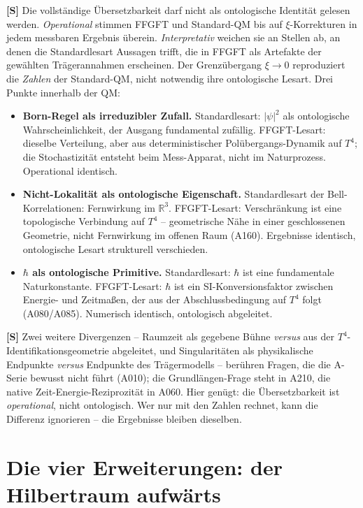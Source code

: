 \textbf{[S]} Die vollständige Übersetzbarkeit darf nicht als ontologische
Identität gelesen werden. \emph{Operational} stimmen FFGFT und Standard-QM bis
auf $\xi$-Korrekturen in jedem messbaren Ergebnis überein. \emph{Interpretativ}
weichen sie an Stellen ab, an denen die Standardlesart Aussagen trifft, die in
FFGFT als Artefakte der gewählten Trägerannahmen erscheinen. Der Grenzübergang
$\xi\to0$ reproduziert die \emph{Zahlen} der Standard-QM, nicht notwendig ihre
ontologische Lesart. Drei Punkte innerhalb der QM:

\begin{itemize}[leftmargin=2em,itemsep=3pt,topsep=3pt]
  \item \textbf{Born-Regel als irreduzibler Zufall.} Standardlesart: $|\psi|^2$
    als ontologische Wahrscheinlichkeit, der Ausgang fundamental zufällig.
    FFGFT-Lesart: dieselbe Verteilung, aber aus deterministischer
    Polübergangs-Dynamik auf $T^4$; die Stochastizität entsteht beim
    Mess-Apparat, nicht im Naturprozess. Operational identisch.
  \item \textbf{Nicht-Lokalität als ontologische Eigenschaft.} Standardlesart der
    Bell-Korrelationen: Fernwirkung im $\mathbb{R}^3$. FFGFT-Lesart:
    Verschränkung ist eine topologische Verbindung auf $T^4$ -- geometrische
    Nähe in einer geschlossenen Geometrie, nicht Fernwirkung im offenen Raum
    (A160). Ergebnisse identisch, ontologische Lesart strukturell verschieden.
  \item \textbf{$\hbar$ als ontologische Primitive.} Standardlesart: $\hbar$ ist
    eine fundamentale Naturkonstante. FFGFT-Lesart: $\hbar$ ist ein
    SI-Konversionsfaktor zwischen Energie- und Zeitmaßen, der aus der
    Abschlussbedingung auf $T^4$ folgt (A080/A085). Numerisch identisch,
    ontologisch abgeleitet.
\end{itemize}

\textbf{[S]} Zwei weitere Divergenzen -- Raumzeit als gegebene Bühne
\emph{versus} aus der $T^4$-Identifikationsgeometrie abgeleitet, und
Singularitäten als physikalische Endpunkte \emph{versus} Endpunkte des
Trägermodells -- berühren Fragen, die die A-Serie bewusst nicht führt (A010);
die Grundlängen-Frage steht in A210,
die native Zeit-Energie-Reziprozität in A060. Hier genügt: die Übersetzbarkeit
ist \emph{operational}, nicht ontologisch. Wer nur mit den Zahlen rechnet, kann
die Differenz ignorieren -- die Ergebnisse bleiben dieselben.

\section{Die vier Erweiterungen: der Hilbertraum aufwärts}


